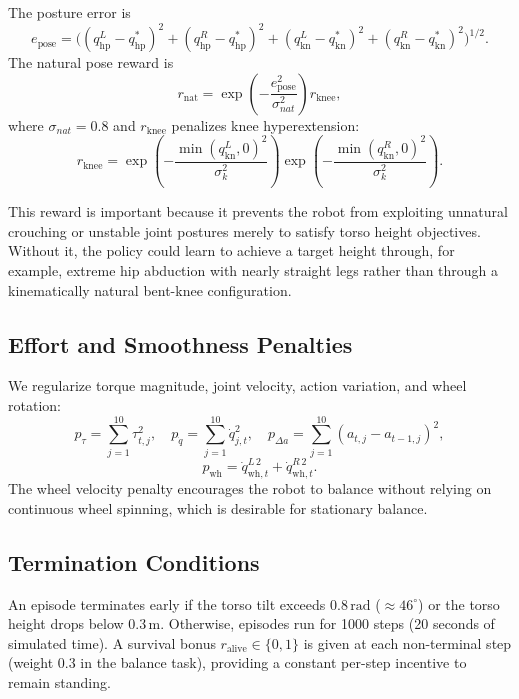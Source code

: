 \documentclass[conference]{IEEEtran}
\begin{document}
The posture error is
\begin{equation}
e_{\mathrm{pose}} =
\Big(
(q_{\mathrm{hp}}^L - q_{\mathrm{hp}}^*)^2
+
(q_{\mathrm{hp}}^R - q_{\mathrm{hp}}^*)^2
+
(q_{\mathrm{kn}}^L - q_{\mathrm{kn}}^*)^2
+
(q_{\mathrm{kn}}^R - q_{\mathrm{kn}}^*)^2
\Big)^{1/2}.
\end{equation}
The natural pose reward is
\begin{equation}
r_{\mathrm{nat}} =
\exp\left(
-\frac{e_{\mathrm{pose}}^2}{\sigma_{nat}^2}
\right)
r_{\mathrm{knee}},
\label{eq:natural_pose}
\end{equation}
where $\sigma_{nat} = 0.8$ and $r_{\mathrm{knee}}$ penalizes knee hyperextension:
\begin{equation}
r_{\mathrm{knee}}=
\exp\left(-\frac{\min(q_{\mathrm{kn}}^L,0)^2}{\sigma_k^2}\right)
\exp\left(-\frac{\min(q_{\mathrm{kn}}^R,0)^2}{\sigma_k^2}\right).
\end{equation}

This reward is important because it prevents the robot from exploiting unnatural crouching or unstable joint postures merely to satisfy torso height objectives. Without it, the policy could learn to achieve a target height through, for example, extreme hip abduction with nearly straight legs rather than through a kinematically natural bent-knee configuration.

\subsection{Effort and Smoothness Penalties}
We regularize torque magnitude, joint velocity, action variation, and wheel rotation:
\begin{equation}
p_\tau = \sum_{j=1}^{10} \tau_{t,j}^2, \quad
p_{\dot{q}} = \sum_{j=1}^{10} \dot{q}_{j,t}^2, \quad
p_{\Delta a} = \sum_{j=1}^{10}(a_{t,j} - a_{t-1,j})^2,
\end{equation}
\begin{equation}
p_{\mathrm{wh}} = \dot{q}_{\mathrm{wh},t}^{L\,2} + \dot{q}_{\mathrm{wh},t}^{R\,2}.
\end{equation}
The wheel velocity penalty encourages the robot to balance without relying on continuous wheel spinning, which is desirable for stationary balance.

\subsection{Termination Conditions}
An episode terminates early if the torso tilt exceeds $0.8\,\mathrm{rad}$ ($\approx 46^\circ$) or the torso height drops below $0.3\,\mathrm{m}$. Otherwise, episodes run for 1000 steps (20 seconds of simulated time). A survival bonus $r_{\mathrm{alive}} \in \{0, 1\}$ is given at each non-terminal step (weight 0.3 in the balance task), providing a constant per-step incentive to remain standing.
\end{document}
